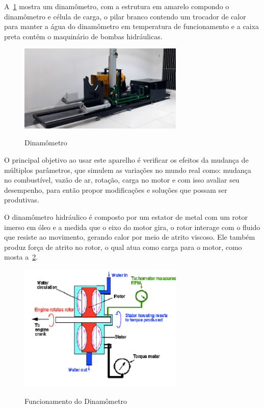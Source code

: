 A~\cref{fig:dinamometro} mostra um dinamômetro, com a estrutura em amarelo compondo o dinamômetro e célula de carga, o pilar branco contendo um trocador de calor para manter a água do dinamômetro em temperatura de funcionamento e a caixa preta contém o maquinário de bombas hidráulicas.
%
\begin{figure}[!htb]
    \centering
    \caption{Dinamômetro}
    \includegraphics[width=0.7\textwidth]{figuras/dinamometro.png}
    \label{fig:dinamometro}
\end{figure}
%
O principal objetivo ao usar este aparelho é verificar os efeitos da mudança de múltiplos parâmetros, que simulem as variações no mundo real como: mudança no combustível, vazão de ar, rotação, carga no motor e com isso avaliar seu desempenho, para então propor modificações e soluções que possam ser produtivas.

O dinamômetro hidráulico é composto por um estator de metal com um rotor imerso em óleo e a medida que o eixo do motor gira, o rotor interage com o fluido que resiste ao movimento, gerando calor por meio de atrito viscoso. Ele também produz força de atrito no rotor, o qual atua como carga para o motor, como mosta a~\cref{fig:dinamometro_funcionamento}. 
%
\begin{figure}[!htb]
    \centering
    \caption{Funcionamento do Dinamômetro}
    \includegraphics[width=0.7\textwidth]{figuras/dinamometro_funcionamento.png}
    \label{fig:dinamometro_funcionamento}
\end{figure}
%
